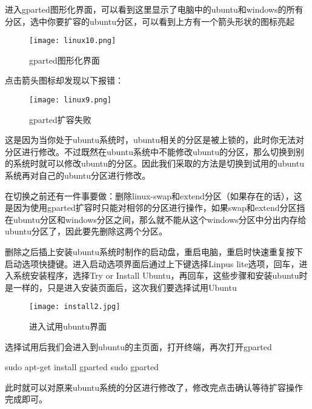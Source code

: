 进入gparted图形化界面，可以看到这里显示了电脑中的ubuntu和windows的所有分区，选中你要扩容的ubuntu分区，可以看到上方有一个箭头形状的图标亮起

\begin{figure}[H]
    \centering
    \texttt{[image: linux10.png]}
    \caption{gparted图形化界面} %
    \label{fig:linux10} %
\end{figure}

点击箭头图标却发现以下报错：

\begin{figure}[H]
    \centering
    \texttt{[image: linux9.png]}
    \caption{gparted扩容失败} %
    \label{fig:linux9} %
\end{figure}

这是因为当你处于ubuntu系统时，ubuntu相关的分区是被上锁的，此时你无法对分区进行修改。不过既然在ubuntu系统中不能修改ubuntu的分区，那么切换到别的系统时就可以修改ubuntu的分区。因此我们采取的方法是切换到试用的ubuntu系统再对自己的ubuntu分区进行修改。

在切换之前还有一件事要做：删除linux-swap和extend分区（如果存在的话），这是因为使用gparted扩容时只能对相邻的分区进行操作，如果swap和extend分区挡在ubuntu分区和windows分区之间，那么就不能从这个windows分区中分出内存给ubuntu分区了，因此要先删除这两个分区。

删除之后插上安装ubuntu系统时制作的启动盘，重启电脑，重启时快速重复按下启动选项快捷键。进入启动选项界面后通过上下键选择Linpus lite选项，回车，进入系统安装程序，选择Try or Install Ubuntu，再回车，这些步骤和安装ubuntu时是一样的，只是进入安装页面后，这次我们要选择试用Ubuntu

\begin{figure}[H]
    \centering
    \texttt{[image: install2.jpg]}
    \caption{进入试用ubuntu界面} %
\end{figure}

选择试用后我们会进入到ubuntu的主页面，打开终端，再次打开gparted

\begin{tcode}
    sudo apt-get install gparted
	sudo gparted
\end{tcode}

此时就可以对原来ubuntu系统的分区进行修改了，修改完点击确认等待扩容操作完成即可。